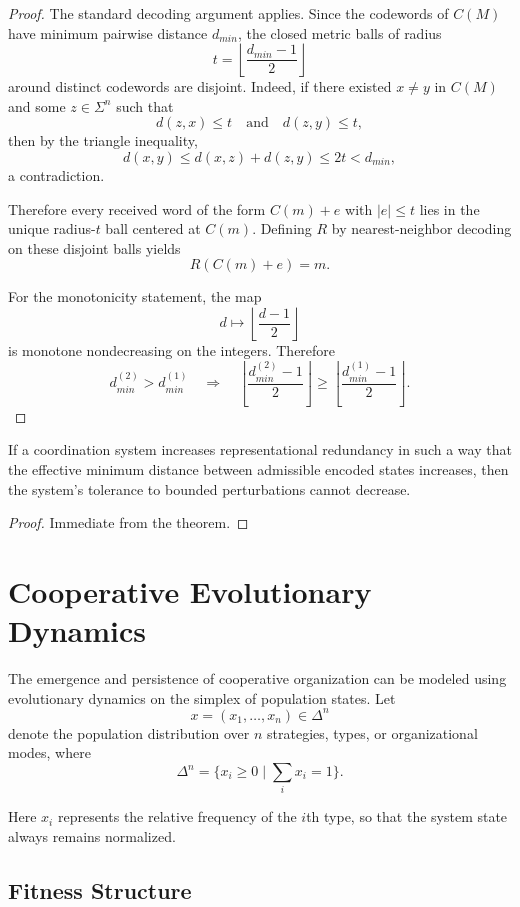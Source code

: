 \documentclass[12pt]{article}
\begin{document}
\begin{proof}
The standard decoding argument applies. Since the codewords of $C(M)$ have minimum pairwise distance $d_{min}$, the closed metric balls of radius
\[
t = \left\lfloor \frac{d_{min}-1}{2} \right\rfloor
\]
around distinct codewords are disjoint. Indeed, if there existed $x \neq y$ in $C(M)$ and some $z \in \Sigma^n$ such that
\[
d(z,x) \le t
\quad\text{and}\quad
d(z,y) \le t ,
\]
then by the triangle inequality,
\[
d(x,y) \le d(x,z)+d(z,y) \le 2t < d_{min},
\]
a contradiction.

Therefore every received word of the form $C(m)+e$ with $|e|\le t$ lies in the unique radius-$t$ ball centered at $C(m)$. Defining $R$ by nearest-neighbor decoding on these disjoint balls yields
\[
R(C(m)+e)=m .
\]

For the monotonicity statement, the map
\[
d \mapsto \left\lfloor \frac{d-1}{2} \right\rfloor
\]
is monotone nondecreasing on the integers. Therefore
\[
d_{min}^{(2)} > d_{min}^{(1)}
\quad\Rightarrow\quad
\left\lfloor \frac{d_{min}^{(2)}-1}{2} \right\rfloor
\ge
\left\lfloor \frac{d_{min}^{(1)}-1}{2} \right\rfloor .
\]
\end{proof}

\begin{corollary}
If a coordination system increases representational redundancy in such a way that the effective minimum distance between admissible encoded states increases, then the system's tolerance to bounded perturbations cannot decrease.
\end{corollary}

\begin{proof}
Immediate from the theorem.
\end{proof}

\section{Cooperative Evolutionary Dynamics}

The emergence and persistence of cooperative organization can be modeled using evolutionary dynamics on the simplex of population states. Let
\[
x = (x_1,\dots,x_n) \in \Delta^n
\]
denote the population distribution over $n$ strategies, types, or organizational modes, where
\[
\Delta^n = \{x_i \ge 0 \; | \; \sum_i x_i = 1\}.
\]

Here $x_i$ represents the relative frequency of the $i$th type, so that the system state always remains normalized.

\subsection{Fitness Structure}
\end{document}
